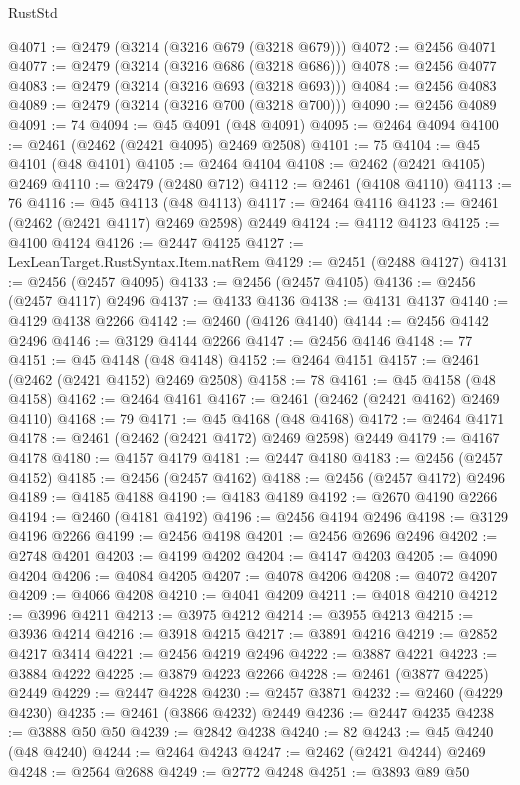 \begin{lexlean}{RustStd}
\begin{coremodule}
@4071 := @2479 (@3214 (@3216 @679 (@3218 @679)))
@4072 := @2456 @4071
@4077 := @2479 (@3214 (@3216 @686 (@3218 @686)))
@4078 := @2456 @4077
@4083 := @2479 (@3214 (@3216 @693 (@3218 @693)))
@4084 := @2456 @4083
@4089 := @2479 (@3214 (@3216 @700 (@3218 @700)))
@4090 := @2456 @4089
@4091 := 74
@4094 := @45 @4091 (@48 @4091)
@4095 := @2464 @4094
@4100 := @2461 (@2462 (@2421 @4095) @2469 @2508)
@4101 := 75
@4104 := @45 @4101 (@48 @4101)
@4105 := @2464 @4104
@4108 := @2462 (@2421 @4105) @2469
@4110 := @2479 (@2480 @712)
@4112 := @2461 (@4108 @4110)
@4113 := 76
@4116 := @45 @4113 (@48 @4113)
@4117 := @2464 @4116
@4123 := @2461 (@2462 (@2421 @4117) @2469 @2598) @2449
@4124 := @4112 @4123
@4125 := @4100 @4124
@4126 := @2447 @4125
@4127 := LexLeanTarget.RustSyntax.Item.natRem
@4129 := @2451 (@2488 @4127)
@4131 := @2456 (@2457 @4095)
@4133 := @2456 (@2457 @4105)
@4136 := @2456 (@2457 @4117) @2496
@4137 := @4133 @4136
@4138 := @4131 @4137
@4140 := @4129 @4138 @2266
@4142 := @2460 (@4126 @4140)
@4144 := @2456 @4142 @2496
@4146 := @3129 @4144 @2266
@4147 := @2456 @4146
@4148 := 77
@4151 := @45 @4148 (@48 @4148)
@4152 := @2464 @4151
@4157 := @2461 (@2462 (@2421 @4152) @2469 @2508)
@4158 := 78
@4161 := @45 @4158 (@48 @4158)
@4162 := @2464 @4161
@4167 := @2461 (@2462 (@2421 @4162) @2469 @4110)
@4168 := 79
@4171 := @45 @4168 (@48 @4168)
@4172 := @2464 @4171
@4178 := @2461 (@2462 (@2421 @4172) @2469 @2598) @2449
@4179 := @4167 @4178
@4180 := @4157 @4179
@4181 := @2447 @4180
@4183 := @2456 (@2457 @4152)
@4185 := @2456 (@2457 @4162)
@4188 := @2456 (@2457 @4172) @2496
@4189 := @4185 @4188
@4190 := @4183 @4189
@4192 := @2670 @4190 @2266
@4194 := @2460 (@4181 @4192)
@4196 := @2456 @4194 @2496
@4198 := @3129 @4196 @2266
@4199 := @2456 @4198
@4201 := @2456 @2696 @2496
@4202 := @2748 @4201
@4203 := @4199 @4202
@4204 := @4147 @4203
@4205 := @4090 @4204
@4206 := @4084 @4205
@4207 := @4078 @4206
@4208 := @4072 @4207
@4209 := @4066 @4208
@4210 := @4041 @4209
@4211 := @4018 @4210
@4212 := @3996 @4211
@4213 := @3975 @4212
@4214 := @3955 @4213
@4215 := @3936 @4214
@4216 := @3918 @4215
@4217 := @3891 @4216
@4219 := @2852 @4217 @3414
@4221 := @2456 @4219 @2496
@4222 := @3887 @4221
@4223 := @3884 @4222
@4225 := @3879 @4223 @2266
@4228 := @2461 (@3877 @4225) @2449
@4229 := @2447 @4228
@4230 := @2457 @3871
@4232 := @2460 (@4229 @4230)
@4235 := @2461 (@3866 @4232) @2449
@4236 := @2447 @4235
@4238 := @3888 @50 @50
@4239 := @2842 @4238
@4240 := 82
@4243 := @45 @4240 (@48 @4240)
@4244 := @2464 @4243
@4247 := @2462 (@2421 @4244) @2469
@4248 := @2564 @2688
@4249 := @2772 @4248
@4251 := @3893 @89 @50

\end{coremodule}
\end{lexlean}
